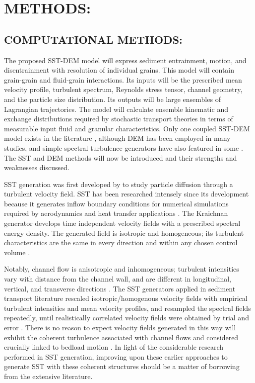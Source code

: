 \section{METHODS:} \label{sec:methods}

\subsection{COMPUTATIONAL METHODS:} \label{sec:compmethods}

The proposed SST-DEM model will express sediment entrainment, motion, and disentrainment with resolution of individual grains. This model will contain grain-grain and fluid-grain interactions. Its inputs will be the prescribed mean velocity profile, turbulent spectrum, Reynolds stress tensor, channel geometry, and the particle size distribution. Its outputs will be large ensembles of Lagrangian trajectories. The model will calculate ensemble kinematic and exchange distributions required by stochastic transport theories in terms of measurable input fluid and granular characteristics. Only one coupled SST-DEM model exists in the literature \citep{Nikora2001a}, although DEM has been employed in many studies, and simple spectral turbulence generators have also featured in some \citep[e.g.][]{Bialik2012}. The SST and DEM methods will now be introduced and their strengths and weaknesses discussed.  
\bigskip 


SST generation was first developed by \citep{Kraichnan1970} to study particle diffusion through a turbulent velocity field. SST has been researched intensely since its development because it generates inflow boundary conditions for numerical simulations required by aerodynamics and heat transfer applications \citep{Shur2014, Dhamankar2015, Wu2017}. The Kraichnan generator develops time independent velocity fields with a prescribed spectral energy density. The generated field is isotropic and homogeneous; its turbulent characteristics are the same in every direction and within any chosen control volume \citep{Wu2017}. 
\bigskip 

Notably, channel flow is anisotropic and inhomogeneous; turbulent intensities vary with distance from the channel wall, and are different in longitudinal, vertical, and transverse directions \citep{Nikora2000}. The SST generators applied in sediment transport literature rescaled isotropic/homogenous velocity fields with empirical turbulent intensities and mean velocity profiles, and resampled the spectral fields repeatedly, until realistically correlated velocity fields were obtained by trial and error \citep{Nikora2001a,Bialik2010}. There is no reason to expect velocity fields generated in this way will exhibit the coherent turbulence  associated with channel flows \citep{Kline1967, Ninto1996, Adrian2007} and considered crucially linked to bedload motion \citep{Vowinckel2016, Shih2017}. In light of the considerable research performed in SST generation, improving upon these earlier approaches to generate SST with these coherent structures should be a matter of borrowing from the extensive literature. 
\bigskip 

